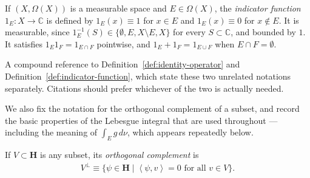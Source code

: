 \begin{definition}
    \label{def:indicator-function}
    \leanok
    If $(X,\Omega(X))$ is a measurable space and $E \in \Omega(X)$, the \textit{indicator function} $1_E : X \to \mathbb{C}$ is defined by $1_E(x) \equiv 1$ for $x \in E$ and $1_E(x) \equiv 0$ for $x \notin E$. It is measurable, since $1_E^{-1}(S) \in \{ \emptyset, E, X\setminus E, X\}$ for every $S \subset \mathbb{C}$, and bounded by $1$. It satisfies $1_E 1_F = 1_{E \cap F}$ pointwise, and $1_E + 1_F = 1_{E \cup F}$ when $E \cap F = \emptyset$.
\end{definition}

\begin{definition}
    \label{def:identity-and-indicator}
    \leanok
    A compound reference to Definition~\ref{def:identity-operator} and Definition~\ref{def:indicator-function}, which state these two unrelated notations separately. Citations should prefer whichever of the two is actually needed.
\end{definition}

We also fix the notation for the orthogonal complement of a subset, and record the basic properties of the Lebesgue integral that are used throughout — including the meaning of $\int_E g \, d\nu$, which appears repeatedly below.

\begin{definition}
    \label{def:orthogonal-complement}
    \leanok
    If $V \subset \mathbf{H}$ is any subset, its \textit{orthogonal complement} is
    \begin{align}
        V^\perp \equiv \{ \psi \in \mathbf{H} \mid \left< \psi, v \right> = 0 \text{ for all } v \in V \}.
    \end{align}
\end{definition}

